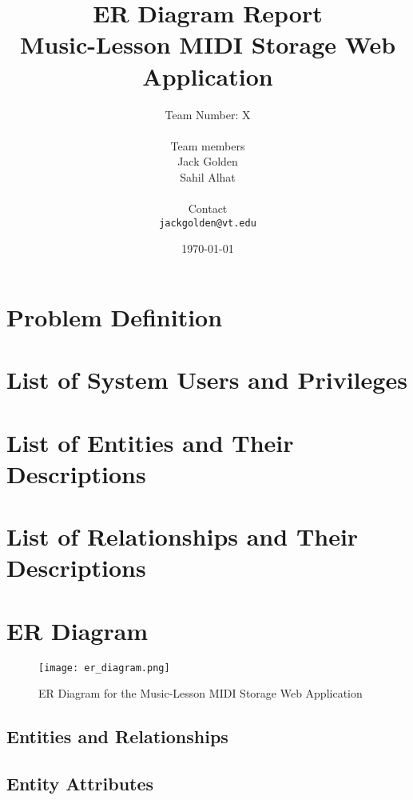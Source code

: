 \documentclass{article}
\title{\vspace{2in} ER Diagram Report \\ \vspace{0.2in} Music-Lesson MIDI Storage Web Application}
\author{Team Number: X \\ \vspace{0.1in} \\ Team members \\ Jack Golden \\ Sahil Alhat \\ \vspace{0.1in}\\ Contact \\ \texttt{jackgolden@vt.edu}}
\date{\vspace{2in} \today}
\begin{document}
\maketitle
\thispagestyle{empty}

\newpage

\section{Problem Definition}

\section{List of System Users and Privileges}

\section{List of Entities and Their Descriptions}

\section{List of Relationships and Their Descriptions}

\section{ER Diagram}
\begin{figure}[htb]
    \centering
    \texttt{[image: er\_diagram.png]}
    \caption{ER Diagram for the Music-Lesson MIDI Storage Web Application}
    \label{fig:er_diagram}
\end{figure}

\newpage

\subsection{Entities and Relationships}

\subsection{Entity Attributes}
\end{document}
